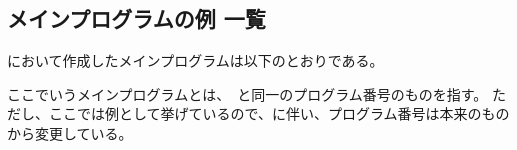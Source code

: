 \setcounter{lstlisting}{0}







\subsection{メインプログラムの例 一覧}
\DMC において作成したメインプログラムは以下のとおりである。
\begin{marker}
ここでいうメインプログラムとは、\DrawingNumber　と同一のプログラム番号のものを指す。
ただし、ここでは例として挙げているので、に伴い、プログラム番号は本来のものから変更している。
\end{marker}

